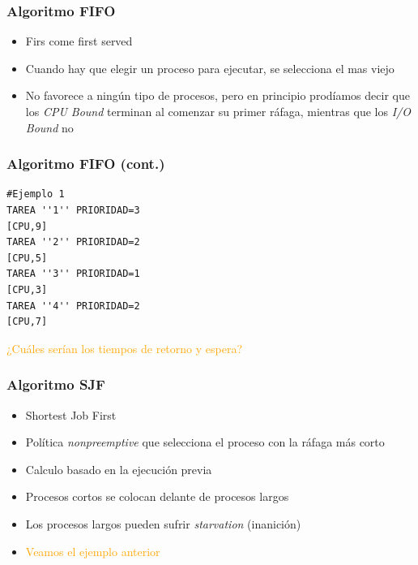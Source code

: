 \begin{frame}
  \frametitle{Algoritmo \textbf{FIFO}}
  \begin{itemize}
		\item Firs come first served
		\item Cuando hay que elegir un proceso para ejecutar, se selecciona el mas viejo
		\item No favorece a ningún tipo de procesos, pero en principio prodíamos decir que los \textit{CPU Bound} terminan al comenzar su primer ráfaga, mientras que los \textit{I/O Bound} no
  \end{itemize}
\end{frame}

\begin{frame}[fragile]
  \frametitle{Algoritmo \textbf{FIFO} (cont.)}
  \begin{table}
      \centering
  \end{table}  
  \begin{lstlisting}
#Ejemplo 1
TAREA ''1'' PRIORIDAD=3
[CPU,9]
TAREA ''2'' PRIORIDAD=2
[CPU,5]
TAREA ''3'' PRIORIDAD=1
[CPU,3]
TAREA ''4'' PRIORIDAD=2
[CPU,7]  
  \end{lstlisting}  
  \hspace{35pt} \textcolor{orange}{¿Cuáles serían los tiempos de retorno y espera?}
\end{frame}

\begin{frame}
  \frametitle{Algoritmo \textbf{SJF}}
  \begin{itemize}
  		\item Shortest Job First
		\item Política \textit{nonpreemptive} que selecciona el proceso con la ráfaga más corto
		\item Calculo basado en la ejecución previa
		\item Procesos cortos se colocan delante de procesos largos
		\item Los procesos largos pueden sufrir \textit{starvation} (inanición)
  		\pause
  		\item \textcolor{orange}{Veamos el ejemplo anterior}	
  \end{itemize}
\end{frame}

